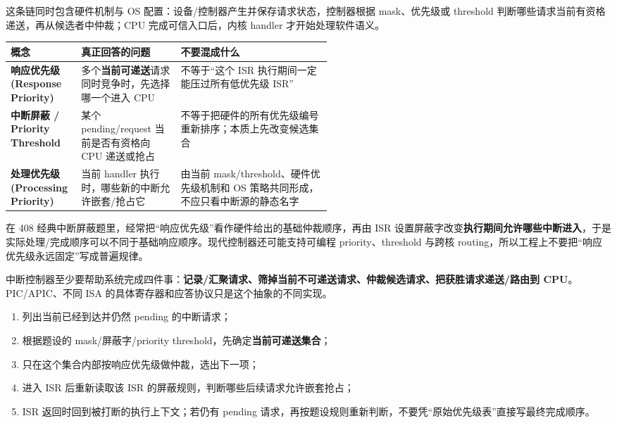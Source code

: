 \documentclass[11pt,a4paper]{ctexart}
\newcommand{\kw}[1]{\textbf{#1}}
\begin{document}
这条链同时包含硬件机制与 OS 配置：设备/控制器产生并保存请求状态，控制器根据 mask、优先级或 threshold 判断哪些请求当前有资格递送，再从候选者中仲裁；CPU 完成可信入口后，内核 handler 才开始处理软件语义。

\begingroup
\small
\renewcommand{\arraystretch}{1.25}
\setlength{\tabcolsep}{5pt}
\begin{tabularx}{\linewidth}{>{\bfseries}p{0.22\linewidth} p{0.31\linewidth} X}
\toprule
概念 & 真正回答的问题 & 不要混成什么\\
\midrule
响应优先级 (Response Priority) & 多个\kw{当前可递送}请求同时竞争时，先选择哪一个进入 CPU & 不等于“这个 ISR 执行期间一定能压过所有低优先级 ISR”\\
中断屏蔽 / Priority Threshold & 某个 pending/request 当前是否有资格向 CPU 递送或抢占 & 不等于把硬件的所有优先级编号重新排序；本质上先改变候选集合\\
处理优先级 (Processing Priority) & 当前 handler 执行时，哪些新的中断允许嵌套/抢占它 & 由当前 mask/threshold、硬件优先级机制和 OS 策略共同形成，不应只看中断源的静态名字\\
\bottomrule
\end{tabularx}
\endgroup

在 408 经典中断屏蔽题里，经常把“响应优先级”看作硬件给出的基础仲裁顺序，再由 ISR 设置屏蔽字改变\kw{执行期间允许哪些中断进入}，于是实际处理/完成顺序可以不同于基础响应顺序。现代控制器还可能支持可编程 priority、threshold 与跨核 routing，所以工程上不要把“响应优先级永远固定”写成普遍规律。

\begin{corebox}[控制器的最小职责模型]
中断控制器至少要帮助系统完成四件事：\kw{记录/汇聚请求、筛掉当前不可递送请求、仲裁候选请求、把获胜请求递送/路由到 CPU}。PIC/APIC、不同 ISA 的具体寄存器和应答协议只是这个抽象的不同实现。
\end{corebox}

\begin{exam}
\begin{enumerate}
  \item 列出当前已经到达并仍然 pending 的中断请求；
  \item 根据题设的 mask/屏蔽字/priority threshold，先确定\kw{当前可递送集合}；
  \item 只在这个集合内部按响应优先级做仲裁，选出下一项；
  \item 进入 ISR 后重新读取该 ISR 的屏蔽规则，判断哪些后续请求允许嵌套抢占；
  \item ISR 返回时回到被打断的执行上下文；若仍有 pending 请求，再按题设规则重新判断，不要凭“原始优先级表”直接写最终完成顺序。
\end{enumerate}
\end{exam}
\end{document}
